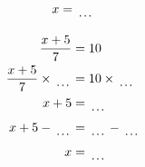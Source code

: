 \documentclass[12pt]{article}
\newcounter{minipagecount}
\begin{document}
\begin{multicols}{2}
\begin{minipage}[t]{0.45\textwidth}
\begin{align*}
        x &= \dotuline{\hspace{5mm}}\\
    \end{align*}
\end{minipage} %
\noindent{(\theminipagecount)}\hspace{0.1mm} %
\begin{minipage}[t]{0.45\textwidth} %
    \vspace{-26pt}  %
    \raggedright %
    \begin{align*} %
        \frac{x + 5}{7} &= 10\\
        \frac{x + 5}{7} \times\dotuline{\hspace{5mm}} &= 10 \times\dotuline{\hspace{5mm}}\\
        x + 5 &= \dotuline{\hspace{5mm}}\\
        x + 5 - \dotuline{\hspace{5mm}} &= \dotuline{\hspace{5mm}} - \dotuline{\hspace{5mm}}\\
        x &= \dotuline{\hspace{5mm}}\\
    \end{align*}
\end{minipage} %
\noindent{(\theminipagecount)}\hspace{0.1mm} %
\begin{minipage}[t]{0.45\textwidth} %
    \vspace{-26pt}  %

\end{minipage}
\end{multicols}
\end{document}
